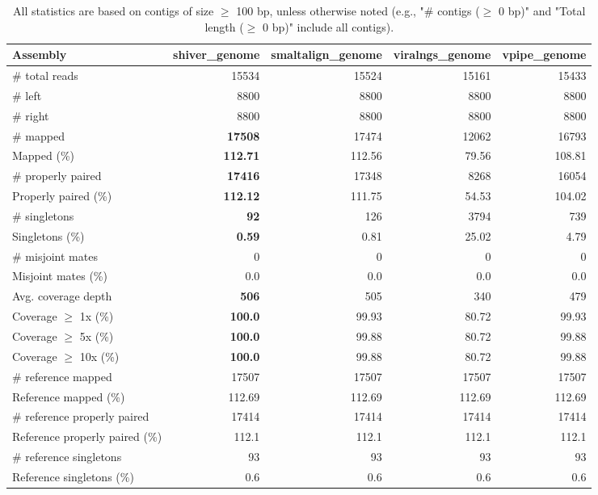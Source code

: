 \documentclass[12pt,a4paper]{article}
\begin{document}
\begin{table}[ht]
\begin{center}
\caption{All statistics are based on contigs of size $\geq$ 100 bp, unless otherwise noted (e.g., "\# contigs ($\geq$ 0 bp)" and "Total length ($\geq$ 0 bp)" include all contigs).}
\begin{tabular}{|l*{4}{|r}|}
\hline
Assembly & shiver\_genome & smaltalign\_genome & viralngs\_genome & vpipe\_genome \\ \hline
\# total reads & 15534 & 15524 & 15161 & 15433 \\ \hline
\# left & 8800 & 8800 & 8800 & 8800 \\ \hline
\# right & 8800 & 8800 & 8800 & 8800 \\ \hline
\# mapped & {\bf 17508} & 17474 & 12062 & 16793 \\ \hline
Mapped (\%) & {\bf 112.71} & 112.56 & 79.56 & 108.81 \\ \hline
\# properly paired & {\bf 17416} & 17348 & 8268 & 16054 \\ \hline
Properly paired (\%) & {\bf 112.12} & 111.75 & 54.53 & 104.02 \\ \hline
\# singletons & {\bf 92} & 126 & 3794 & 739 \\ \hline
Singletons (\%) & {\bf 0.59} & 0.81 & 25.02 & 4.79 \\ \hline
\# misjoint mates & 0 & 0 & 0 & 0 \\ \hline
Misjoint mates (\%) & 0.0 & 0.0 & 0.0 & 0.0 \\ \hline
Avg. coverage depth & {\bf 506} & 505 & 340 & 479 \\ \hline
Coverage $\geq$ 1x (\%) & {\bf 100.0} & 99.93 & 80.72 & 99.93 \\ \hline
Coverage $\geq$ 5x (\%) & {\bf 100.0} & 99.88 & 80.72 & 99.88 \\ \hline
Coverage $\geq$ 10x (\%) & {\bf 100.0} & 99.88 & 80.72 & 99.88 \\ \hline
\# reference mapped & 17507 & 17507 & 17507 & 17507 \\ \hline
Reference mapped (\%) & 112.69 & 112.69 & 112.69 & 112.69 \\ \hline
\# reference properly paired & 17414 & 17414 & 17414 & 17414 \\ \hline
Reference properly paired (\%) & 112.1 & 112.1 & 112.1 & 112.1 \\ \hline
\# reference singletons & 93 & 93 & 93 & 93 \\ \hline
Reference singletons (\%) & 0.6 & 0.6 & 0.6 & 0.6 \\ \hline

\end{tabular}
\end{center}
\end{table}
\end{document}
